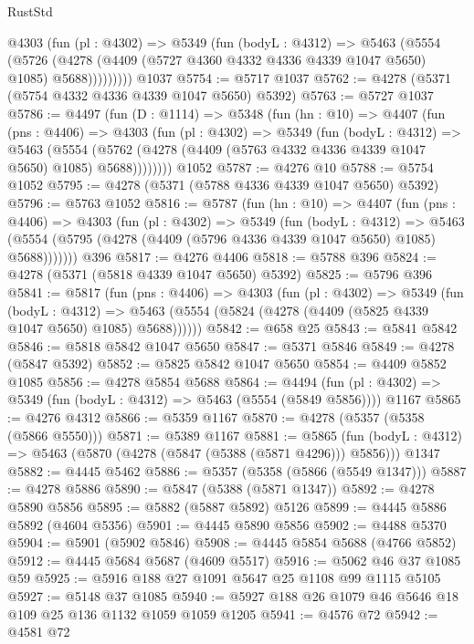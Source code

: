 \begin{lexlean}{RustStd}
\begin{coremodule}
          @4303
            (fun (pl : @4302) =>
            @5349
              (fun (bodyL : @4312) =>
              @5463
                (@5554
                  (@5726
                    (@4278 (@4409 (@5727 @4360 @4332 @4336 @4339 @1047 @5650) @1085) @5688)))))))))
    @1037
@5754 := @5717 @1037
@5762 := @4278 (@5371 (@5754 @4332 @4336 @4339 @1047 @5650) @5392)
@5763 := @5727 @1037
@5786 := @4497
    (fun (D : @1114) =>
    @5348
      (fun (hn : @10) =>
      @4407
        (fun (pns : @4406) =>
        @4303
          (fun (pl : @4302) =>
          @5349
            (fun (bodyL : @4312) =>
            @5463
              (@5554 (@5762 (@4278 (@4409 (@5763 @4332 @4336 @4339 @1047 @5650) @1085) @5688))))))))
    @1052
@5787 := @4276 @10
@5788 := @5754 @1052
@5795 := @4278 (@5371 (@5788 @4336 @4339 @1047 @5650) @5392)
@5796 := @5763 @1052
@5816 := @5787
    (fun (hn : @10) =>
    @4407
      (fun (pns : @4406) =>
      @4303
        (fun (pl : @4302) =>
        @5349
          (fun (bodyL : @4312) =>
          @5463 (@5554 (@5795 (@4278 (@4409 (@5796 @4336 @4339 @1047 @5650) @1085) @5688)))))))
    @396
@5817 := @4276 @4406
@5818 := @5788 @396
@5824 := @4278 (@5371 (@5818 @4339 @1047 @5650) @5392)
@5825 := @5796 @396
@5841 := @5817
    (fun (pns : @4406) =>
    @4303
      (fun (pl : @4302) =>
      @5349
        (fun (bodyL : @4312) =>
        @5463 (@5554 (@5824 (@4278 (@4409 (@5825 @4339 @1047 @5650) @1085) @5688))))))
@5842 := @658 @25
@5843 := @5841 @5842
@5846 := @5818 @5842 @1047 @5650
@5847 := @5371 @5846
@5849 := @4278 (@5847 @5392)
@5852 := @5825 @5842 @1047 @5650
@5854 := @4409 @5852 @1085
@5856 := @4278 @5854 @5688
@5864 := @4494
    (fun (pl : @4302) => @5349 (fun (bodyL : @4312) => @5463 (@5554 (@5849 @5856))))
    @1167
@5865 := @4276 @4312
@5866 := @5359 @1167
@5870 := @4278 (@5357 (@5358 (@5866 @5550)))
@5871 := @5389 @1167
@5881 := @5865
    (fun (bodyL : @4312) => @5463 (@5870 (@4278 (@5847 (@5388 (@5871 @4296))) @5856)))
    @1347
@5882 := @4445 @5462
@5886 := @5357 (@5358 (@5866 (@5549 @1347)))
@5887 := @4278 @5886
@5890 := @5847 (@5388 (@5871 @1347))
@5892 := @4278 @5890 @5856
@5895 := @5882 (@5887 @5892) @5126
@5899 := @4445 @5886 @5892 (@4604 @5356)
@5901 := @4445 @5890 @5856
@5902 := @4488 @5370
@5904 := @5901 (@5902 @5846)
@5908 := @4445 @5854 @5688 (@4766 @5852)
@5912 := @4445 @5684 @5687 (@4609 @5517)
@5916 := @5062 @46 @37 @1085 @59
@5925 := @5916 @188 @27 @1091 @5647 @25 @1108 @99 @1115 @5105
@5927 := @5148 @37 @1085
@5940 := @5927 @188 @26 @1079 @46 @5646 @18 @109 @25 @136 @1132 @1059 @1059 @1205
@5941 := @4576 @72
@5942 := @4581 @72

\end{coremodule}
\end{lexlean}
